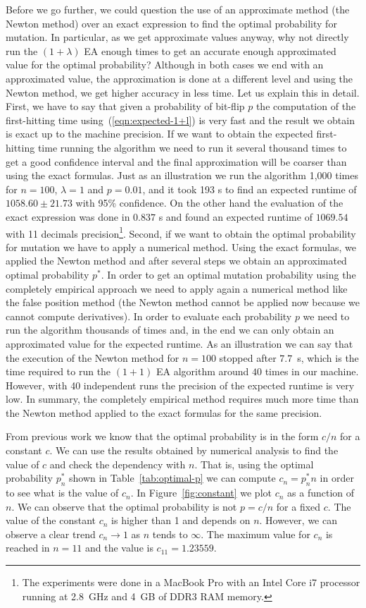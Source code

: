 \documentclass{article}
\begin{document}
Before we go further, we could question the use of an approximate method (the Newton method) over an exact expression to find the optimal probability for mutation. In particular, as we get approximate values anyway, why not directly run the $(1+\lambda)$ EA enough times to get an accurate enough approximated value for the optimal probability? Although in both cases we end with an approximated value, the approximation is done at a different level and using the Newton method, we get higher accuracy in less time. Let us explain this in detail. First, we have to say that given a probability of bit-flip $p$ the computation of the first-hitting time using~(\ref{eqn:expected-1+l}) is very fast and the result we obtain is exact up to the machine precision. If we want to obtain the expected first-hitting time running the algorithm we need to run it several thousand times to get a good confidence interval and the final approximation will be coarser than using the exact formulas. Just as an illustration we run the algorithm 1,000 times for $n=100$, $\lambda=1$ and $p=0.01$, and it took 193 s to find an expected runtime of $1058.60\pm21.73$ with 95\% confidence. On the other hand the evaluation of the exact expression was done in $0.837$ s and found an expected runtime of $1069.54$ with 11 decimals precision\footnote{The experiments were done in a MacBook Pro with an Intel Core i7 processor running at 2.8~GHz and 4~GB of DDR3 RAM memory.}.
Second, if we want to obtain the optimal probability for mutation we have to apply a numerical method. Using the exact formulas, we applied the Newton method and after several steps we obtain an approximated optimal probability $p^*$. In order to get an optimal mutation probability using the completely empirical approach we need to apply again a numerical method like the false position method (the Newton method cannot be applied now because we cannot compute derivatives). In order to evaluate each probability $p$ we need to run the algorithm thousands of times and, in the end we can only obtain an approximated value for the expected runtime. As an illustration we can say that the execution of the Newton method for $n=100$ stopped after $7.7$~s, which is the time required to run the $(1+1)$ EA algorithm around $40$ times in our machine. However, with 40 independent runs the precision of the expected runtime is very low. In summary, the completely empirical method requires much more time than the Newton method applied to the exact formulas for the same precision.


From previous work we know that the optimal probability is in the form $c/n$ for a constant $c$. We can use the results obtained by numerical analysis to find the value of $c$ and check the dependency with $n$. That is, using the optimal probability $p_n^*$ shown in Table~\ref{tab:optimal-p} we can compute $c_n = p_n^* n$ in order to see what is the value of $c_n$. In Figure~\ref{fig:constant} we plot $c_n$ as a function of $n$. We can observe that the optimal probability is not $p=c/n$ for a fixed $c$. The value of the constant $c_n$ is higher than 1 and depends on $n$. However, we can observe a clear trend $c_n \rightarrow 1$ as $n$ tends to $\infty$. The maximum value for $c_n$ is reached in $n=11$ and the value is $c_{11}=1.23559$.
\end{document}
